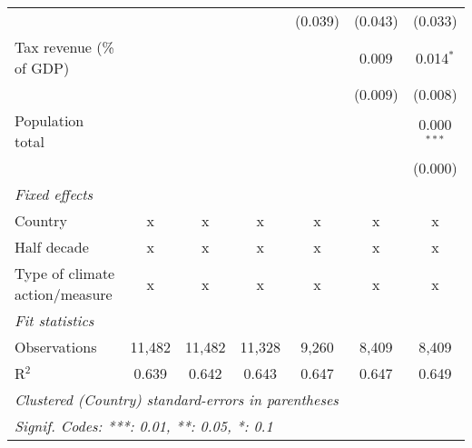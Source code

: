 \begin{tabular}{lcccccc}
                                                               &         &               &               & (0.039)       & (0.043)      & (0.033)\\   
   Tax revenue (\% of GDP)                                     &         &               &               &               & 0.009        & 0.014$^{*}$\\   
                                                               &         &               &               &               & (0.009)      & (0.008)\\   
   Population total                                            &         &               &               &               &              & 0.000$^{***}$\\   
                                                               &         &               &               &               &              & (0.000)\\   
   \emph{Fixed effects}\\
   Country                                                     & x       & x             & x             & x             & x            & x\\  
   Half decade                                                 & x       & x             & x             & x             & x            & x\\  
   Type of climate action/measure                              & x       & x             & x             & x             & x            & x\\  
   \midrule \emph{Fit statistics}\\
   Observations                                                & 11,482  & 11,482        & 11,328        & 9,260         & 8,409        & 8,409\\  
   R$^2$                                                       & 0.639   & 0.642         & 0.643         & 0.647         & 0.647        & 0.649\\  
   \midrule
   \multicolumn{7}{l}{\emph{Clustered (Country) standard-errors in parentheses}}\\
   \multicolumn{7}{l}{\emph{Signif. Codes: ***: 0.01, **: 0.05, *: 0.1}}\\
\end{tabular}
\par\endgroup


